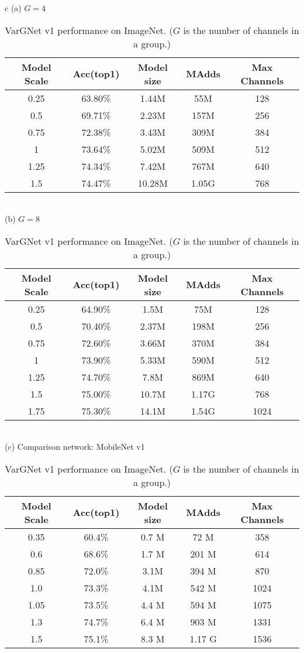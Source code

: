 \documentclass{article}
\begin{document}
\begin{table}
  \centering
  \caption{VarGNet v1 performance on ImageNet. ($G$ is the number of channels in a group.)}\label{tab:vargnetv1_comp}
  \begin{tabular}{c}
    (a) $G=4$ \\
    \begin{tabular}{ccccc}
      \toprule
      Model Scale & Acc(top1) & Model size & MAdds & Max Channels \\ \midrule
      0.25 & 63.80\% & 1.44M & 55M & 128\\
      0.5 & 69.71\% & 2.23M & 157M & 256\\
      0.75 & 72.38\% & 3.43M & 309M & 384\\
      1 & 73.64\% & 5.02M & 509M & 512\\
      1.25 & 74.34\% & 7.42M & 767M & 640\\
      1.5 & 74.47\% & 10.28M & 1.05G & 768\\
\bottomrule
    \end{tabular} \\
    (b) $G=8$ \\
    \begin{tabular}{ccccc}
      \toprule
      Model Scale & Acc(top1) & Model size & MAdds & Max Channels \\ \midrule
      0.25 & 64.90\% & 1.5M & 75M & 128 \\
      0.5 & 70.40\% & 2.37M & 198M & 256 \\
      0.75 & 72.60\% & 3.66M & 370M & 384 \\
      1 & 73.90\% & 5.33M & 590M & 512 \\
      1.25 & 74.70\% & 7.8M & 869M & 640 \\
      1.5 & 75.00\% & 10.7M & 1.17G & 768 \\
      1.75 & 75.30\% & 14.1M & 1.54G & 1024 \\
\bottomrule
    \end{tabular} \\
    (c) Comparison network: MobileNet v1\\
    \begin{tabular}{ccccc}
      \toprule
      Model Scale & Acc(top1) & Model size & MAdds & Max Channels \\ \midrule
      0.35 & 60.4\% & 0.7 M & 72 M & 358 \\
      0.6 & 68.6\% & 1.7 M & 201 M & 614 \\
      0.85 & 72.0\% & 3.1M & 394 M & 870  \\
      1.0 & 73.3\% & 4.1M & 542 M & 1024  \\
      1.05 & 73.5\% & 4.4 M & 594 M & 1075 \\
      1.3 & 74.7\% & 6.4 M & 903 M & 1331 \\
      1.5 & 75.1\% & 8.3 M & 1.17 G & 1536  \\
\bottomrule
    \end{tabular}
  \end{tabular}
\end{table}
\end{document}
